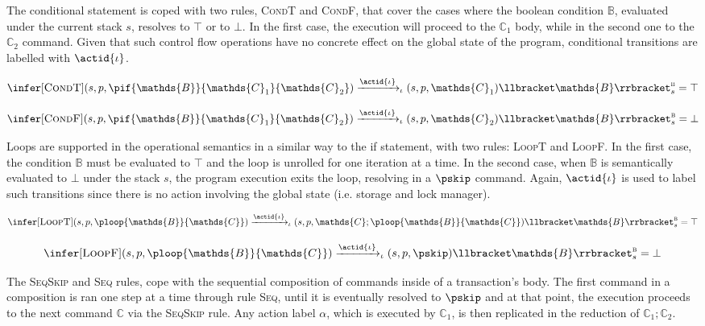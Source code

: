 The conditional statement is coped with two rules, \textsc{CondT} and \textsc{CondF}, that cover the cases where the boolean condition $\mathds{B}$, evaluated under the current stack $s$, resolves to $\top$ or to $\bot$. In the first case, the execution will proceed to the $\mathds{C}_1$ body, while in the second one to the $\mathds{C}_2$ command. Given that such control flow operations have no concrete effect on the global state of the program, conditional transitions are labelled with $\actid{\iota}$.

\[
\infer[\textsc{CondT}]
{
	(s, p, \pif{\mathds{B}}{\mathds{C}_1}{\mathds{C}_2})
	\xrightarrow{\actid{\iota}}_\iota
	(s, p, \mathds{C}_1)
}
{
	\llbracket \mathds{B} \rrbracket_s^\textsc{b} = \top
}
\]

\[
\infer[\textsc{CondF}]
{
	(s, p, \pif{\mathds{B}}{\mathds{C}_1}{\mathds{C}_2})
	\xrightarrow{\actid{\iota}}_\iota
	(s, p, \mathds{C}_2)
}
{
	\llbracket \mathds{B} \rrbracket_s^\textsc{b} = \bot
}
\]

Loops are supported in the operational semantics in a similar way to the if statement, with two rules: \textsc{LoopT} and \textsc{LoopF}. In the first case, the condition $\mathds{B}$ must be evaluated to $\top$ and the loop is unrolled for one iteration at a time. In the second case, when $\mathds{B}$ is semantically evaluated to $\bot$ under the stack $s$, the program execution exits the loop, resolving in a $\pskip$ command. Again, $\actid{\iota}$ is used to label such transitions since there is no action involving the global state (i.e. storage and lock manager).

\[
\infer[\textsc{LoopT}]
{
	(s, p, \ploop{\mathds{B}}{\mathds{C}})
	\xrightarrow{\actid{\iota}}_\iota
	(s, p, \mathds{C}; \ploop{\mathds{B}}{\mathds{C}})
}
{
	\llbracket \mathds{B} \rrbracket_s^\textsc{b} = \top
}
\]

\[
\infer[\textsc{LoopF}]
{
	(s, p, \ploop{\mathds{B}}{\mathds{C}})
	\xrightarrow{\actid{\iota}}_\iota
	(s, p, \pskip)
}
{
	\llbracket \mathds{B} \rrbracket_s^\textsc{b} = \bot
}
\]

The \textsc{SeqSkip} and \textsc{Seq} rules, cope with the sequential composition of commands inside of a transaction's body. The first command in a composition is ran one step at a time through rule \textsc{Seq}, until it is eventually resolved to $\pskip$ and at that point, the execution proceeds to the next command $\mathds{C}$ via the \textsc{SeqSkip} rule. Any action label $\alpha$, which is executed by $\mathds{C}_1$, is then replicated in the reduction of $\mathds{C}_1 ; \mathds{C}_2$.

